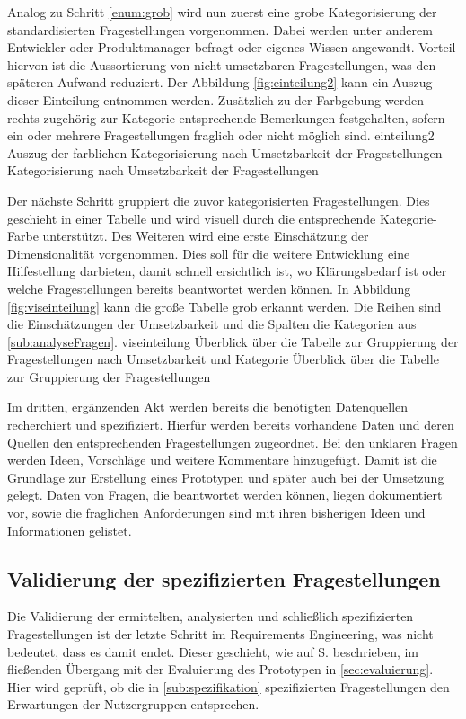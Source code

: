 Analog zu Schritt \ref{enum:grob} wird nun zuerst eine grobe Kategorisierung der standardisierten Fragestellungen vorgenommen. 
Dabei werden unter anderem Entwickler oder Produktmanager befragt oder eigenes Wissen angewandt.
Vorteil hiervon ist die Aussortierung von nicht umsetzbaren Fragestellungen, was den späteren Aufwand reduziert.
Der Abbildung \ref{fig:einteilung2} kann ein Auszug dieser Einteilung entnommen werden.
Zusätzlich zu der Farbgebung werden rechts zugehörig zur Kategorie entsprechende Bemerkungen festgehalten, sofern ein oder mehrere Fragestellungen fraglich oder nicht möglich sind.
\bildbreit
{einteilung2}
{Auszug der farblichen Kategorisierung nach Umsetzbarkeit der Fragestellungen}
{Kategorisierung nach Umsetzbarkeit der Fragestellungen}

Der nächste Schritt gruppiert die zuvor kategorisierten Fragestellungen.
Dies geschieht in einer Tabelle und wird visuell durch die entsprechende Kategorie-Farbe unterstützt.
Des Weiteren wird eine erste Einschätzung der Dimensionalität vorgenommen.
Dies soll für die weitere Entwicklung eine Hilfestellung darbieten, damit schnell ersichtlich ist, wo Klärungsbedarf ist oder welche Fragestellungen bereits beantwortet werden können.
In Abbildung \ref{fig:viseinteilung} kann die große Tabelle grob erkannt werden.
Die Reihen sind die Einschätzungen der Umsetzbarkeit und die Spalten die Kategorien aus \ref{sub:analyseFragen}.
\bildbreit
{viseinteilung}
{Überblick über die Tabelle zur Gruppierung der Fragestellungen nach Umsetzbarkeit und Kategorie}
{Überblick über die Tabelle zur Gruppierung der Fragestellungen}

Im dritten, ergänzenden Akt werden bereits die benötigten Datenquellen recherchiert und spezifiziert.
Hierfür werden bereits vorhandene Daten und deren Quellen den entsprechenden Fragestellungen zugeordnet.
Bei den unklaren Fragen werden Ideen, Vorschläge und weitere Kommentare hinzugefügt.
Damit ist die Grundlage zur Erstellung eines Prototypen und später auch bei der Umsetzung gelegt.
Daten von Fragen, die beantwortet werden können, liegen dokumentiert vor, sowie die fraglichen Anforderungen sind mit ihren bisherigen Ideen und Informationen gelistet. 



\subsection{Validierung der spezifizierten Fragestellungen}
Die Validierung der ermittelten, analysierten und schließlich spezifizierten Fragestellungen ist der letzte Schritt im Requirements Engineering, was nicht bedeutet, dass es damit endet.
Dieser geschieht, wie auf S.\pageref{sec:erhebung} beschrieben, im fließenden Übergang mit der Evaluierung des Prototypen in \ref{sec:evaluierung}.
Hier wird geprüft, ob die in \ref{sub:spezifikation} spezifizierten Fragestellungen den Erwartungen der Nutzergruppen entsprechen.

